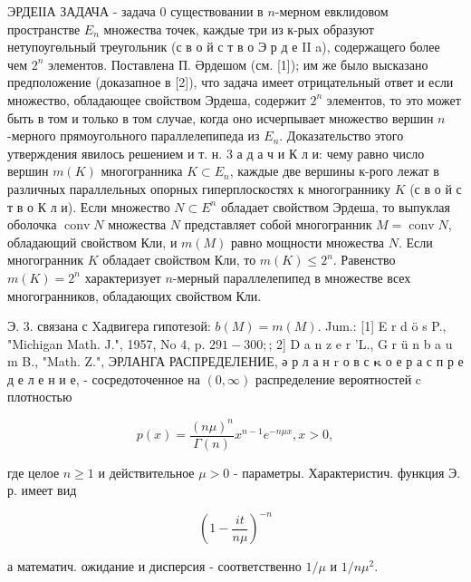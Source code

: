 \documentclass[10pt]{article}
\begin{document}
ЭРДЕІІА ЗАДАЧА - задача 0 существовании в $n$-мерном евклидовом пространстве $E_{n}$ множества точек, каждые три из к-рых образуют нетупоугөльный треугольник (с в о й с т в о Э р д е II a), содержащего более чем $2^{n}$ элементов. Поставлена П. Әрдешом (см. [1]); им же было высказано предположение (доказапное в [2]), что задача имеет отрицательный ответ и если множество, обладающее свойством Эрдеша, содержит $2^{n}$ элементов, то это может быть в том и только в том случае, когда оно исчерпывает множество вершин $n$-мерного прямоугольного параллелепипеда из $E_{n}$. Доказательство этого утверждения явилось решением и т. н. 3 а д а ч и К л и: чему равно число вершин $m(K)$ многогранника $K \subset E_{n}$, каждые две вершины к-рого лежат в различных параллельных опорных гиперплоскостях к многограннику $K$ (с в о й с т в о К л и). Если множество $N \subset E^{n}$ обладает свойством Эрдеша, то выпуклая оболочка $\operatorname{conv} N$ множества $N$ представляет собой многогранник $M=\operatorname{conv} N$, обладающий свойством Кли, и $m(M)$ равно мощности множества $N$. Если многогранник $K$ обладает свойством Кли, то $m(K) \leqslant 2^{n}$. Равенство $m(K)=2^{n}$ характеризует $n$-мерный параллелепипед в множестве всех многогранников, обладающих свойством Кли.



Э. 3. связана с Xадвигера гипотезой: $b(M)=m(M)$. Jum.: [1] E r d ö s P., "Michigan Math. J.", 1957, No 4, p. $291-300 ;$; 2] D a n z e r 'L., G r ü n b a u m B., "Math. Z.", ЭРЛАНГА РАСПРЕДЕЛЕНИЕ, ә р л а н $\mathrm{r}$ о в с $\boldsymbol{\kappa}$ о е р а с п р е д е л е н и е, - сосредоточенное на $(0, \infty)$ распределение вероятностей $\mathrm{c}$ плотностью



\[

p(x)=\frac{(n \mu)^{n}}{\Gamma(n)} x^{n-1} e^{-n \mu x}, x>0,

\]



где целое $n \geqslant 1$ и действительное $\mu>0$ - параметры. Характеристич. функция Э. р. имеет вид



\[

\left(1-\frac{i t}{n \mu}\right)^{-n}

\]



а математич. ожидание и дисперсия - соответственно $1 / \mu$ и $1 / n \mu^{2}$.
\end{document}

